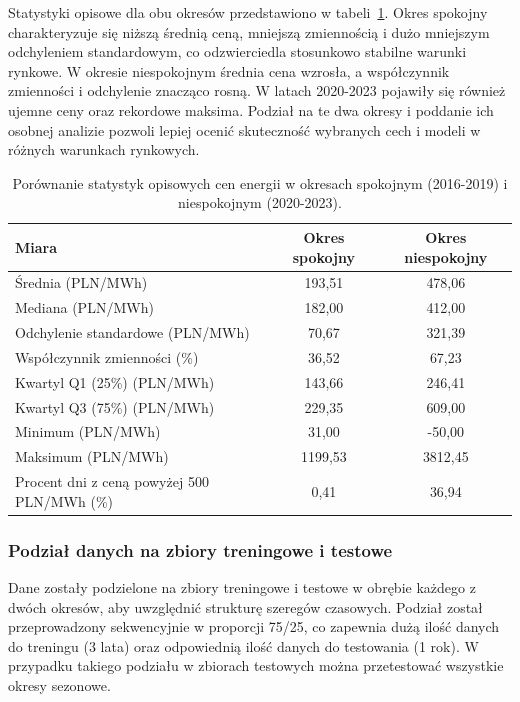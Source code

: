 Statystyki opisowe dla obu okresów przedstawiono w tabeli~\ref{tab:periods_stats_comparison}. Okres spokojny charakteryzuje się niższą średnią ceną, mniejszą zmiennością i dużo mniejszym odchyleniem standardowym, co odzwierciedla stosunkowo stabilne warunki rynkowe. W okresie niespokojnym średnia cena wzrosła, a współczynnik zmienności i odchylenie znacząco rosną. W latach 2020-2023 pojawiły się również ujemne ceny oraz rekordowe maksima. Podział na te dwa okresy i poddanie ich osobnej analizie pozwoli lepiej ocenić skuteczność wybranych cech i modeli w różnych warunkach rynkowych.

\begin{table}[h]
    \centering
    \caption{Porównanie statystyk opisowych cen energii w okresach spokojnym (2016-2019) i niespokojnym (2020-2023).}
    \label{tab:periods_stats_comparison}
    \begin{tabular}{|l|c|c|}
        \hline
        \textbf{Miara} & \textbf{Okres spokojny} & \textbf{Okres niespokojny} \\
        \hline
        Średnia (PLN/MWh) & 193,51 & 478,06 \\
        \hline
        Mediana (PLN/MWh) & 182,00 & 412,00 \\
        \hline
        Odchylenie standardowe (PLN/MWh) & 70,67 & 321,39 \\
        \hline
        Współczynnik zmienności (\%) & 36,52 & 67,23 \\
        \hline
        Kwartyl Q1 (25\%) (PLN/MWh) & 143,66 & 246,41 \\
        \hline
        Kwartyl Q3 (75\%) (PLN/MWh) & 229,35 & 609,00 \\
        \hline
        Minimum (PLN/MWh) & 31,00 & -50,00 \\
        \hline
        Maksimum (PLN/MWh) & 1199,53 & 3812,45 \\
        \hline
        Procent dni z ceną powyżej 500 PLN/MWh (\%) & 0,41 & 36,94 \\
        \hline
    \end{tabular}
\end{table}

\subsubsection{Podział danych na zbiory treningowe i testowe}

Dane zostały podzielone na zbiory treningowe i testowe w obrębie każdego z dwóch okresów, aby uwzględnić strukturę szeregów czasowych. Podział został przeprowadzony sekwencyjnie w proporcji 75/25, co zapewnia dużą ilość danych do treningu (3 lata) oraz odpowiednią ilość danych do testowania (1 rok). W przypadku takiego podziału w zbiorach testowych można przetestować wszystkie okresy sezonowe.

